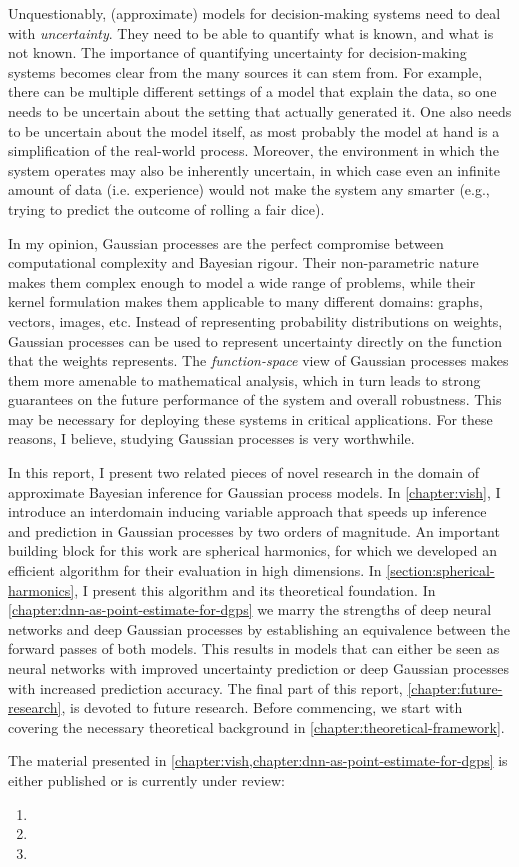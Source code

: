 Unquestionably, (approximate) models for decision-making systems need to deal with \emph{uncertainty}. They need to be able to quantify what is known, and what is not known. The importance of quantifying uncertainty for decision-making systems becomes clear from the many sources it can stem from. For example, there can be multiple different settings of a model that explain the data, so one needs to be uncertain about the setting that actually generated it. One also needs to be uncertain about the model itself, as most probably the model at hand is a simplification of the real-world process. Moreover, the environment in which the system operates may also be inherently uncertain, in which case even an infinite amount of data (i.e. experience) would not make the system any smarter (e.g., trying to predict the outcome of rolling a fair dice).

In my opinion, Gaussian processes are the perfect compromise between computational complexity and Bayesian rigour. Their non-parametric nature makes them complex enough to model a wide range of problems, while their kernel formulation makes them applicable to many different domains: graphs, vectors, images, etc. Instead of representing probability distributions on weights, Gaussian processes can be used to represent uncertainty directly on the function that the weights represents. The \emph{function-space} view of Gaussian processes makes them more amenable to mathematical analysis, which in turn leads to strong guarantees on the future performance of the system and overall robustness. This may be necessary for deploying these systems in critical applications. For these reasons, I believe, studying Gaussian processes is very worthwhile.

In this report, I present two related pieces of novel research in the domain of approximate Bayesian inference for Gaussian process models. In \cref{chapter:vish}, I introduce an interdomain inducing variable approach that speeds up inference and prediction in Gaussian processes by two orders of magnitude. An important building block for this work are spherical harmonics, for which we developed an efficient algorithm for their evaluation in high dimensions. In \cref{section:spherical-harmonics}, I present this algorithm and its theoretical foundation. In \cref{chapter:dnn-as-point-estimate-for-dgps} we marry the strengths of deep neural networks and deep Gaussian processes by establishing an equivalence between the forward passes of both models. This results in models that can either be seen as neural networks with improved uncertainty prediction or deep Gaussian processes with increased prediction accuracy. The final part of this report, \cref{chapter:future-research}, is devoted to future research. Before commencing, we start with covering the necessary theoretical background in \cref{chapter:theoretical-framework}.

The material presented in \cref{chapter:vish,chapter:dnn-as-point-estimate-for-dgps} is either published or is currently under review:
\begin{enumerate}
    \item {}
    \item {}
    \item {}
\end{enumerate}
